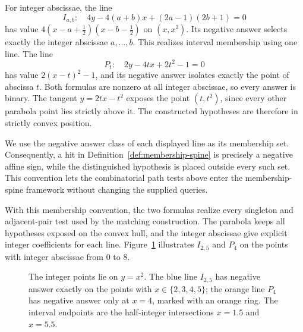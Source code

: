 For integer abscissae, the line
\[
 I_{a,b}:\quad
 4y-4(a+b)x+(2a-1)(2b+1)=0
\]
has value $4(x-a+\tfrac12)(x-b-\tfrac12)$ on $(x,x^2)$.
Its negative answer selects exactly the integer abscissae
$a,\ldots,b$. This realizes interval membership using one line.
The line
\begin{equation}\label{eq:private-singleton}
 P_t:\quad 2y-4tx+2t^2-1=0
\end{equation}
has value $2(x-t)^2-1$, and its negative answer isolates exactly
the point of abscissa $t$. Both formulas are nonzero at all integer
abscissae, so every answer is binary.
The tangent $y=2tx-t^2$ exposes the point $(t,t^2)$, since every
other parabola point lies strictly above it. The constructed
hypotheses are therefore in strictly convex position.

We use the negative answer class of each displayed line as its
membership set. Consequently, a hit in
Definition~\ref{def:membership-spine} is precisely a negative affine
sign, while the distinguished hypothesis is placed outside every such
set. This convention lets the combinatorial path tests above enter the
membership-spine framework without changing the supplied queries.



With this membership convention, the two formulas realize every
singleton and adjacent-pair test used by the matching construction.
The parabola keeps all hypotheses exposed on the convex hull, and the
integer abscissae give explicit integer coefficients for each line.
Figure~\ref{fig:parabola-queries} illustrates $I_{2,5}$ and $P_4$ on
the points with integer abscissae from $0$ to $8$.

\begin{figure}[tbp]
\centering
{}
\caption{The integer points lie on $y=x^2$. The blue line
$I_{2,5}$ has negative answer exactly on the points with
$x\in\{2,3,4,5\}$; the orange line $P_4$ has negative answer only
at $x=4$, marked with an orange ring. The interval endpoints are
the half-integer intersections $x=1.5$ and $x=5.5$.}
\label{fig:parabola-queries}
\end{figure}

